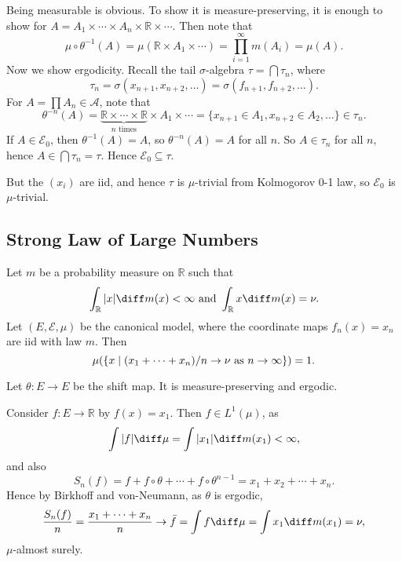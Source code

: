 \documentclass[12pt]{article}
\begin{document}
\begin{proofbox}
	Being measurable is obvious. To show it is measure-preserving, it is enough to show for $A = A_1 \times \cdots \times A_n \times \mathbb{R} \times \cdots$. Then note that
	\[
	\mu \circ \theta^{-1}(A) = \mu(\mathbb{R} \times A_1 \times \cdots) = \prod_{i = 1}^{\infty} m(A_i) = \mu(A).
	\]
	Now we show ergodicity. Recall the tail $\sigma$-algebra $\tau = \bigcap \tau_n$, where
	\[
	\tau_n = \sigma(x_{n+1}, x_{n+2}, \ldots) = \sigma(f_{n+1}, f_{n+2}, \ldots).
	\]
	For $A = \prod A_n \in \mathcal{A}$, note that
	\[
		\theta^{-n}(A) = \underbrace{\mathbb{R} \times \cdots \times \mathbb{R}}_{n \text{ times}} \times A_1 \times \cdots = \{x_{n+1} \in A_1, x_{n+2} \in A_2, \ldots \} \in \tau_n.
	\]
	If $A \in \mathcal{E}_0$, then $\theta^{-1}(A) = A$, so $\theta^{-n}(A) = A$ for all $n$. So $A \in \tau_n$ for all $n$, hence $A \in \bigcap \tau_n = \tau$. Hence $\mathcal{E}_0 \subseteq \tau$.

	But the $(x_i)$ are iid, and hence $\tau$ is $\mu$-trivial from Kolmogorov 0-1 law, so $\mathcal{E}_0$ is $\mu$-trivial.
\end{proofbox}

\subsection{Strong Law of Large Numbers}
\label{sub:slln}

\begin{theorem}
	Let $m$ be a probability measure on $\mathbb{R}$ such that
	\[
		\int_{\mathbb{R}}|x| \diff m(x) < \infty \text{ and } \int_{\mathbb{R}}x \diff m(x) = \nu.
	\]
	Let $(E, \mathcal{E}, \mu)$ be the canonical model, where the coordinate maps $f_n(x) = x_n$ are iid with law $m$. Then
	\[\normalfont
		\mu( \{x \mid (x_1 + \cdots + x_n)/n \to \nu \text{ as } n \to \infty\}) = 1.
	\]
\end{theorem}

\begin{proofbox}
	Let $\theta : E \to E$ be the shift map. It is measure-preserving and ergodic.

	Consider $f : E \to \mathbb{R}$ by $f(x) = x_1$. Then $f \in L^1(\mu)$, as
	\[
	\int |f| \diff \mu = \int |x_1| \diff m(x_1) < \infty,
	\]
	and also
	\[
	S_n(f) = f + f \circ \theta + \cdots + f \circ \theta^{n-1} = x_1 + x_2 + \cdots + x_n.
	\]
	Hence by Birkhoff and von-Neumann, as $\theta$ is ergodic,
	\[
	\frac{S_n(f)}{n} = \frac{x_1 + \cdots + x_n}{n} \to \bar f = \int f \diff \mu = \int x_1 \diff m(x_1) = \nu,
	\]
	$\mu$-almost surely.
\end{proofbox}
\end{document}
